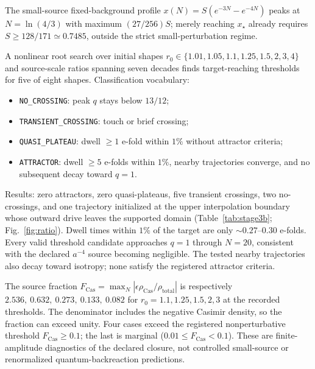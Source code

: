 \documentclass[aps,prd,reprint,superscriptaddress,nofootinbib,floatfix,showkeys]{revtex4-2}
\begin{document}
The small-source fixed-background profile
\(x(N)=S(e^{-3N}-e^{-4N})\) peaks at \(N=\ln(4/3)\) with maximum
\((27/256)S\); merely reaching \(x_\star\) already requires
\(S\ge 128/171\simeq 0.7485\), outside the strict small-perturbation regime.

A nonlinear root search over initial shapes
\(r_0\in\{1.01,1.05,1.1,1.25,1.5,2,3,4\}\) and source-scale ratios spanning seven decades
finds target-reaching thresholds for five of eight shapes.
Classification vocabulary:
\begin{itemize}
\item \texttt{NO\_CROSSING}: peak \(q\) stays below \(13/12\);
\item \texttt{TRANSIENT\_CROSSING}: touch or brief crossing;
\item \texttt{QUASI\_PLATEAU}: dwell \(\ge 1\) e-fold within \(1\%\) without
attractor criteria;
\item \texttt{ATTRACTOR}: dwell \(\ge 5\) e-folds within \(1\%\), nearby
trajectories converge, and no subsequent decay toward \(q=1\).
\end{itemize}
Results: zero attractors, zero quasi-plateaus, five transient crossings,
two no-crossings, and one trajectory initialized at the upper interpolation
boundary whose outward drive leaves the supported domain
(Table~\ref{tab:stage3b}; Fig.~\ref{fig:ratio}).
Dwell times within \(1\%\) of the target are only
\(\sim 0.27\)--\(0.30\) e-folds.
Every valid threshold candidate approaches \(q=1\) through \(N=20\), consistent with the
declared \(a^{-4}\) source becoming negligible.  The tested nearby
trajectories also decay toward isotropy; none satisfy the registered attractor
criteria.

The source fraction
\(F_{\mathrm{Cas}}=\max_N|\epsilon\rho_{\mathrm{Cas}}/
\rho_{\mathrm{total}}|\) is respectively
\(2.536,\ 0.632,\ 0.273,\ 0.133,\ 0.082\) for
\(r_0=1.1,1.25,1.5,2,3\) at the recorded thresholds. The denominator
includes the negative Casimir density, so the fraction can exceed unity.
Four cases exceed the registered nonperturbative threshold \(F_{\mathrm{Cas}}
\ge0.1\); the last is marginal (\(0.01\le F_{\mathrm{Cas}}<0.1\)).
These are finite-amplitude diagnostics of the declared closure, not
controlled small-source or renormalized quantum-backreaction predictions.
\end{document}
